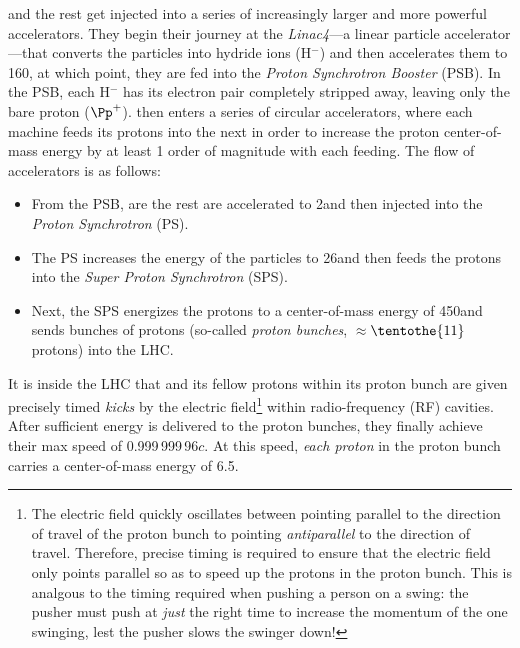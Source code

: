 \pname and the rest get injected into a series of increasingly larger and more powerful accelerators.
They begin their journey at the \emph{Linac4}---a linear particle accelerator---that converts the particles into hydride ions (H$^-$) and then accelerates them to 160\MeV, at which point, they are fed into the \emph{Proton Synchrotron Booster} (PSB).
In the PSB, each H$^-$ has its electron pair completely stripped away, leaving only the bare proton ($\Pp^+$).
\pname then enters a series of circular accelerators, where each machine feeds its protons into the next in order to increase the proton center-of-mass energy by at least 1 order of magnitude with each feeding.
The flow of accelerators is as follows:
\begin{itemize}
    \item From the PSB, \pname are the rest are accelerated to 2\GeV and then injected into the \emph{Proton Synchrotron} (PS).
    \item The PS increases the energy of the particles to 26\GeV and then feeds the protons into the \emph{Super Proton Synchrotron} (SPS).
    \item Next, the SPS energizes the protons to a center-of-mass energy of 450\GeV and sends bunches of protons (so-called \emph{proton bunches}, $\approx$$\tentothe{11}$ protons) into the LHC. %
\end{itemize}
It is inside the LHC that \pname and its fellow protons within its proton bunch are given precisely timed \emph{kicks} by the electric field\footnote{
    The electric field quickly oscillates between pointing parallel to the direction of travel of the proton bunch to pointing \emph{antiparallel} to the direction of travel.
    Therefore, precise timing is required to ensure that the electric field only points parallel so as to speed up the protons in the proton bunch.
    This is analgous to the timing required when pushing a person on a swing:
    the pusher must push at \emph{just} the right time to increase the momentum of the one swinging, lest the pusher slows the swinger down!
} within radio-frequency (RF) cavities.
After sufficient energy is delivered to the proton bunches, they finally achieve their max speed of 0.999\,999\,96$c$. %
At this speed, \emph{each proton} in the proton bunch carries a center-of-mass energy of 6.5\TeV.

